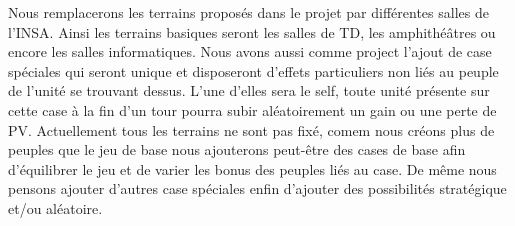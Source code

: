 Nous remplacerons les terrains proposés dans le projet par différentes salles de l'INSA. Ainsi les terrains basiques seront les salles de TD, les amphithéâtres ou encore les salles informatiques. Nous avons aussi comme project l'ajout de case spéciales qui seront unique et disposeront d'effets particuliers non liés au peuple de l'unité se trouvant dessus. L'une d'elles sera le self, toute unité présente sur cette case à la fin d'un tour pourra subir aléatoirement un gain ou une perte de PV.
Actuellement tous les terrains ne sont pas fixé, comem nous créons plus de peuples que le jeu de base nous ajouterons peut-être des cases  de base afin d'équilibrer le jeu et de varier les bonus des peuples liés au case. De même nous pensons ajouter d'autres case spéciales enfin d'ajouter des possibilités stratégique et/ou aléatoire.